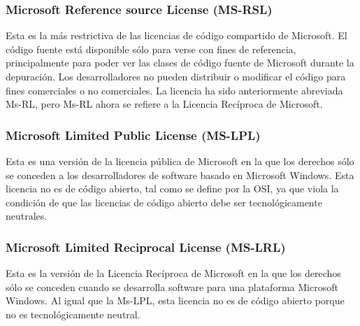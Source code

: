 \subsubsection{Microsoft Reference source License (MS-RSL)}
Esta es la más restrictiva de las licencias de código compartido de Microsoft. El código fuente está disponible sólo para verse con fines de referencia, principalmente para poder ver las clases de código fuente de Microsoft durante la depuración. Los desarrolladores no pueden distribuir o modificar el código para fines comerciales o no comerciales. La licencia ha sido anteriormente abreviada Ms-RL, pero Ms-RL ahora se refiere a la Licencia Recíproca de Microsoft.\cite{wiki_2019:microsoft_reference_source_license_msrsl}
\subsubsection{Microsoft Limited Public License (MS-LPL)}
Esta es una versión de la licencia pública de Microsoft en la que los derechos sólo se conceden a los desarrolladores de software basado en Microsoft Windows. Esta licencia no es de código abierto, tal como se define por la OSI, ya que viola la condición de que las licencias de código abierto debe ser tecnológicamente neutrales.\cite{wiki_2019:microsoft_limited_public_license_mslpl}
\subsubsection{Microsoft Limited Reciprocal License (MS-LRL)}
Esta es la versión de la Licencia Recíproca de Microsoft en la que los derechos sólo se conceden cuando se desarrolla software para una plataforma Microsoft Windows. Al igual que la Ms-LPL, esta licencia no es de código abierto porque no es tecnológicamente neutral.\cite{wiki_2019:microsoft_limited_reciprocal_license_mslrl}